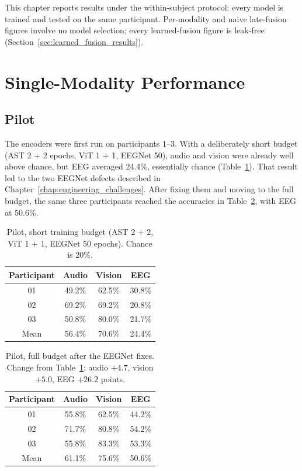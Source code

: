 This chapter reports results under the within-subject protocol: every model is trained and tested on the same participant. Per-modality and naive late-fusion figures involve no model selection; every learned-fusion figure is leak-free (Section~\ref{sec:learned_fusion_results}).

\section{Single-Modality Performance}

\subsection{Pilot}
The encoders were first run on participants 1--3. With a deliberately short budget (AST 2 + 2 epochs, ViT 1 + 1, EEGNet 50), audio and vision were already well above chance, but EEG averaged 24.4\%, essentially chance (Table~\ref{tab:day1_smoke_test}). That result led to the two EEGNet defects described in Chapter~\ref{chap:engineering_challenges}. After fixing them and moving to the full budget, the same three participants reached the accuracies in Table~\ref{tab:day2_full_budget}, with EEG at 50.6\%.

\begin{table}[htbp]
\centering
\small
\caption{Pilot, short training budget (AST 2 + 2, ViT 1 + 1, EEGNet 50 epochs). Chance is 20\%.}
\label{tab:day1_smoke_test}
\begin{tabular}{c c c c}
\hline
\textbf{Participant} & \textbf{Audio} & \textbf{Vision} & \textbf{EEG} \\
\hline
01 & 49.2\% & 62.5\% & 30.8\% \\
02 & 69.2\% & 69.2\% & 20.8\% \\
03 & 50.8\% & 80.0\% & 21.7\% \\
\hline
Mean & 56.4\% & 70.6\% & 24.4\% \\
\hline
\end{tabular}
\end{table}

\begin{table}[htbp]
\centering
\small
\caption{Pilot, full budget after the EEGNet fixes. Change from Table~\ref{tab:day1_smoke_test}: audio $+4.7$, vision $+5.0$, EEG $+26.2$ points.}
\label{tab:day2_full_budget}
\begin{tabular}{c c c c}
\hline
\textbf{Participant} & \textbf{Audio} & \textbf{Vision} & \textbf{EEG} \\
\hline
01 & 55.8\% & 62.5\% & 44.2\% \\
02 & 71.7\% & 80.8\% & 54.2\% \\
03 & 55.8\% & 83.3\% & 53.3\% \\
\hline
Mean & 61.1\% & 75.6\% & 50.6\% \\
\hline
\end{tabular}
\end{table}

